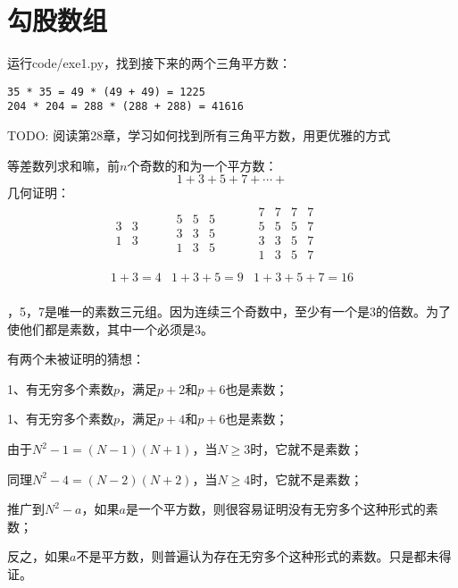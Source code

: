 \chapter{勾股数组}
\exercise
运行code/exe1.py，找到接下来的两个三角平方数：
\begin{verbatim}
35 * 35 = 49 * (49 + 49) = 1225
204 * 204 = 288 * (288 + 288) = 41616
\end{verbatim}
TODO: 阅读第28章，学习如何找到所有三角平方数，用更优雅的方式

\exercise
等差数列求和嘛，前$n$个奇数的和为一个平方数：
\[1+3+5+7+\cdots+\]
几何证明：
\[
    \begin{array}{ccc}
        \begin{array}{cc}
            3 & 3 \\
            1 & 3 \\
        \end{array} &
        \begin{array}{ccc}
            5 & 5 & 5 \\
            3 & 3 & 5 \\
            1 & 3 & 5 \\
        \end{array} &
        \begin{array}{cccc}
            7 & 7 & 7 & 7 \\
            5 & 5 & 5 & 7 \\
            3 & 3 & 5 & 7 \\
            1 & 3 & 5 & 7 \\
        \end{array} \\

        1 + 3 = 4 &
        1 + 3 + 5 = 9 &
        1 + 3 + 5 + 7 = 16 \\
    \end{array}
\]

，5，7是唯一的素数三元组。因为连续三个奇数中，至少有一个是3的倍数。为了使他们都是素数，其中一个必须是3。\par
有两个未被证明的猜想：\par
1、有无穷多个素数$p$，满足$p+2$和$p+6$也是素数；\par
1、有无穷多个素数$p$，满足$p+4$和$p+6$也是素数；

\exercise
由于$N^2-1=(N-1)(N+1)$，当$N\ge3$时，它就不是素数；\par
同理$N^2-4=(N-2)(N+2)$，当$N\ge4$时，它就不是素数；\par
推广到$N^2-a$，如果$a$是一个平方数，则很容易证明没有无穷多个这种形式的素数；\par
反之，如果$a$不是平方数，则普遍认为存在无穷多个这种形式的素数。只是都未得证。

